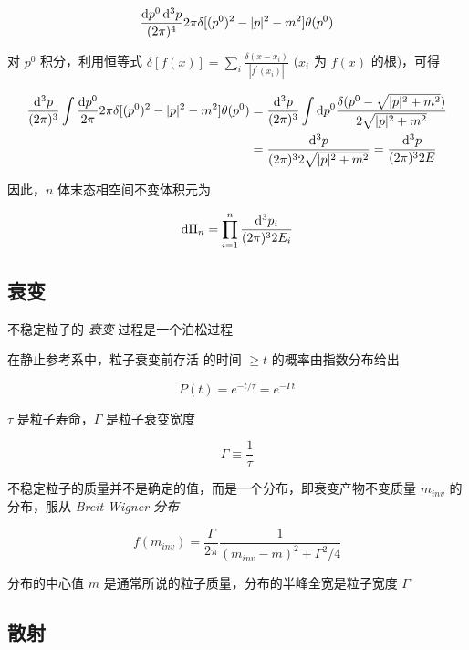 \begin{equation}
    \frac{\mathop{}\!\mathrm{d} p^0 \mathop{}\!\mathrm{d}^3 p}{(2\pi)^4} 2\pi\delta [(p^0)^2-|p|^2-m^2] \theta(p^0)
\end{equation}

对 $p^0$ 积分，利用恒等式 $\delta[f(x)] = \sum_i \frac{\delta(x-x_i)}{|f^\prime(x_i)|}$ ($x_i$ 为 $f(x)$ 的根)，可得

\begin{align}
    \frac{\mathop{}\!\mathrm{d}^3 p}{(2\pi)^3} \int \frac{\mathop{}\!\mathrm{d} p^0}{2\pi} 2\pi\delta[(p^0)^2-|p|^2-m^2] \theta(p^0) &= \frac{\mathop{}\!\mathrm{d}^3 p}{(2\pi)^3} \int \mathop{}\!\mathrm{d} p^0 \frac{\delta(p^0-\sqrt{|p|^2+m^2})}{2\sqrt{|p|^2+m^2}} \\
    &= \frac{\mathop{}\!\mathrm{d}^3 p}{(2\pi)^3 2\sqrt{|p|^2+m^2}} = \frac{\mathop{}\!\mathrm{d}^3 p}{(2\pi)^3 2E}
\end{align}

因此，$n$ 体末态相空间不变体积元为

\begin{equation}
    \mathop{}\!\mathrm{d} \Pi_n = \prod_{i=1}^n \frac{\mathop{}\!\mathrm{d}^3 p_i}{(2\pi)^3 2E_i}
\end{equation}

\subsection{衰变}

不稳定粒子的 \emph{衰变} 过程是一个泊松过程

在静止参考系中，粒子衰变前存活 的时间 $\ge t$ 的概率由指数分布给出

\begin{equation}
    P(t) = e^{-t/\tau} = e^{-\Gamma t}
\end{equation}

$\tau$ 是粒子寿命，$\Gamma$ 是粒子衰变宽度

\begin{equation}
    \Gamma \equiv \frac{1}{\tau}
\end{equation}

不稳定粒子的质量并不是确定的值，而是一个分布，即衰变产物不变质量 $m_{inv}$ 的分布，服从 \emph{Breit-Wigner 分布}

\begin{equation}
    f(m_{inv}) = \frac{\Gamma}{2\pi} \frac{1}{(m_{inv}-m)^2+\Gamma^2/4}
\end{equation}

分布的中心值 $m$ 是通常所说的粒子质量，分布的半峰全宽是粒子宽度 $\Gamma$

\subsection{散射}

